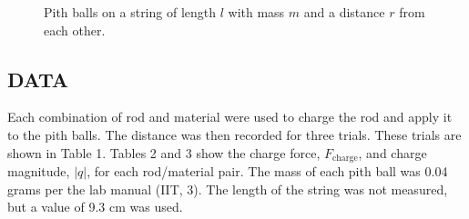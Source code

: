 \documentclass [12pt, letterpaper, twoside] {article}
\begin{document}
\begin{figure}
  \begin{center}
    \caption{Pith balls on a string of length \(l\) with mass \(m\) and a distance \(r\) from each other.}
  \end{center}
\end{figure}

\subsection* {DATA}
Each combination of rod and material were used to charge the rod and apply it to the pith balls. The distance was then recorded for three trials. These trials are shown in Table 1. Tables 2 and 3 show the charge force, \(F_{\text{charge}}\), and charge magnitude, \(|q|\), for each rod/material pair. The mass of each pith ball was 0.04 grams per the lab manual (IIT, 3). The length of the string was not measured, but a value of 9.3 cm was used.
\end{document}
